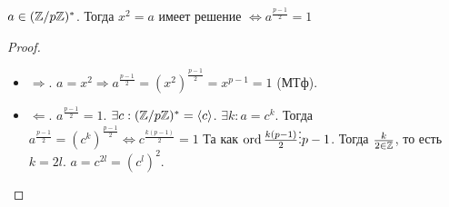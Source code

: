 \begin{theorem}
    $a \in (\mathbb{Z} / p \mathbb{Z})^*$. Тогда  $x^2 = a$ имеет решение  $\iff a^{\frac{p-1}{2}} = 1$
\end{theorem}
\begin{proof}
    \slashn
    \begin{itemize}
        \item $\Rightarrow$.  $a = x^2 \Rightarrow a^{\frac{p-1}{2}} = (x^2)^{\frac{p-1}{2}} = x^{p-1} = 1$ (МТф).
        \item $\Leftarrow$.  $a^{\frac{p-1}{2}} = 1$. $\exists c: (\mathbb{Z} / p \mathbb{Z})^* = \langle c \rangle$.  $\exists k: a = c^k$. Тогда  $a^{\frac{p-1}{2}} = (c^k)^{\frac{p-1}{2}} \iff c^{\frac{k(p-1)}{2}} = 1$ Та как $\operatorname{ord} \frac{k(p-1)}{2} \vdots p - 1$. Тогда  $\frac{k}{2 \in \mathbb{Z}}$, то есть $k = 2l$.  $a = c^{2l} = (c^l)^2$.
    \end{itemize}
\end{proof}
